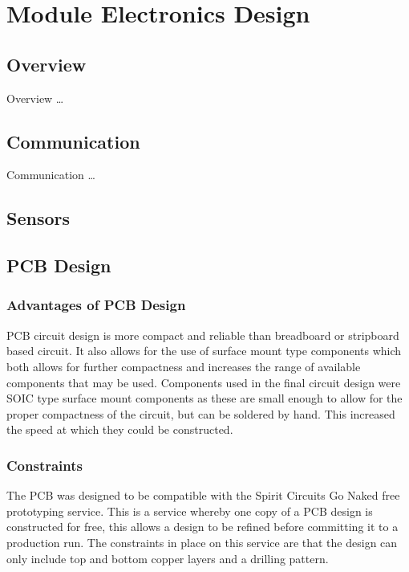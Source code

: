 \chapter{Module Electronics Design} \label{Chapter:ModuleElecDesign}

\section{Overview}
Overview \dots

\section{Communication}
Communication \dots

\section{Sensors}



\section{PCB Design}
\subsection{Advantages of PCB Design}
PCB circuit design is more compact and reliable than breadboard or stripboard based circuit. It also allows for the use of surface mount type components which both allows for further compactness and increases the range of available components that may be used.
Components used in the final circuit design were SOIC type surface mount components as these are small enough to allow for the proper compactness of the circuit, but can be soldered by hand. This increased the speed at which they could be constructed.

\subsection{Constraints}
The PCB was designed to be compatible with the Spirit Circuits Go Naked free prototyping service. This is a service whereby one copy of a PCB design is constructed for free, this allows a design to be refined before committing it to a production run. The constraints in place on this service are that the design can only include top and bottom copper layers and a drilling pattern.

